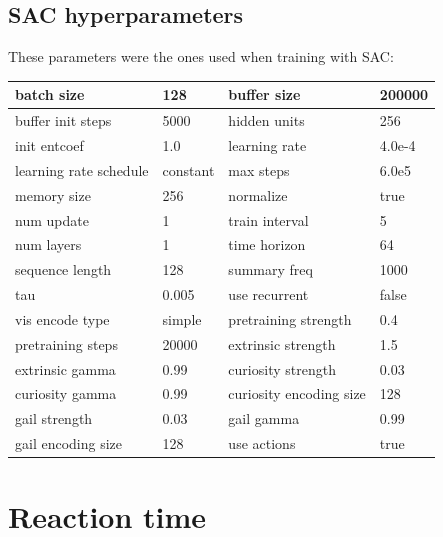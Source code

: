 \pagebreak

\subsection{SAC hyperparameters}

These parameters were the ones used when training with SAC:
\begin{center}
	\begin{tabular}{ | m{4cm} | m{2.5cm}||m{4cm} | m{2.5cm} | } 
		\hline
			batch size & 128 & buffer size & 200000\\ 
		\hline
			buffer init steps & 5000 & hidden units & 256\\
		\hline
			init entcoef & 1.0 & learning rate & 4.0e-4\\
		\hline
			learning rate schedule & constant & max steps & 6.0e5\\
		\hline
			memory size & 256 & normalize & true\\
		\hline
			num update & 1 & train interval & 5\\
		\hline
			num layers & 1 & time horizon & 64\\
		\hline
			sequence length & 128 & summary freq & 1000\\
		\hline
			tau & 0.005 & use recurrent & false\\
		\hline
			vis encode type & simple & pretraining strength & 0.4\\
		\hline
			pretraining steps & 20000 & extrinsic strength & 1.5\\
		\hline
			extrinsic gamma & 0.99 & curiosity strength & 0.03\\
		\hline
			curiosity gamma & 0.99 & curiosity encoding size & 128\\
		\hline
			gail strength & 0.03 & gail gamma & 0.99\\
		\hline
			gail encoding size & 128 & use actions & true\\
		\hline
	\end{tabular}
\end{center}


\pagebreak

\section{Reaction time}

